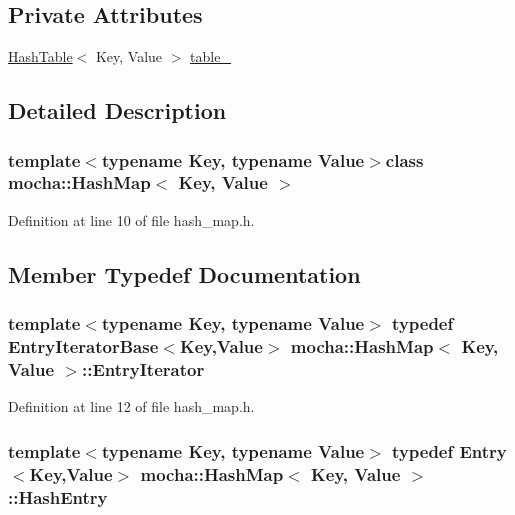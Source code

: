 \subsection*{Private Attributes}
\begin{DoxyCompactItemize}
\item 
\hyperlink{classmocha_1_1_hash_table}{HashTable}$<$ Key, Value $>$ \hyperlink{classmocha_1_1_hash_map_af489c982641060de9bc6ea74193d0c93}{table\_\-}
\end{DoxyCompactItemize}


\subsection{Detailed Description}
\subsubsection*{template$<$typename Key, typename Value$>$class mocha::HashMap$<$ Key, Value $>$}



Definition at line 10 of file hash\_\-map.h.



\subsection{Member Typedef Documentation}
\hypertarget{classmocha_1_1_hash_map_adb61a0b1c576b5a3820642e28c7c03ba}{
\subsubsection[{EntryIterator}]{\setlength{\rightskip}{0pt plus 5cm}template$<$typename Key, typename Value$>$ typedef {\bf EntryIteratorBase}$<$Key,Value$>$ {\bf mocha::HashMap}$<$ Key, Value $>$::{\bf EntryIterator}}}
\label{classmocha_1_1_hash_map_adb61a0b1c576b5a3820642e28c7c03ba}


Definition at line 12 of file hash\_\-map.h.

\hypertarget{classmocha_1_1_hash_map_ae59c02064cc9b37392d9653d20273185}{
\subsubsection[{HashEntry}]{\setlength{\rightskip}{0pt plus 5cm}template$<$typename Key, typename Value$>$ typedef {\bf Entry}$<$Key,Value$>$ {\bf mocha::HashMap}$<$ Key, Value $>$::{\bf HashEntry}}}
\label{classmocha_1_1_hash_map_ae59c02064cc9b37392d9653d20273185}


